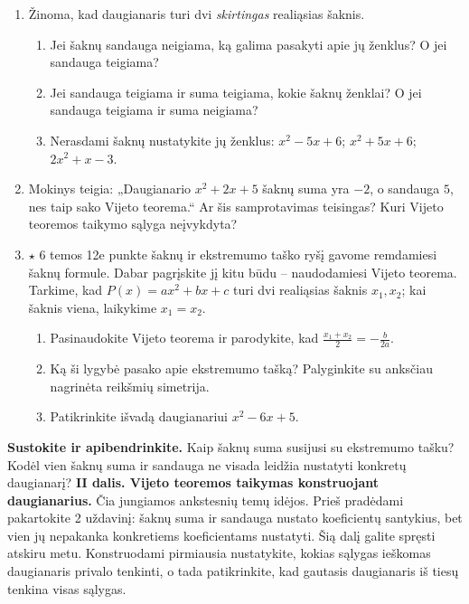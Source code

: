 \documentclass[12pt,a4paper]{article}
\begin{document}
\begin{enumerate}[series=uzdaviniai]
\item Žinoma, kad daugianaris turi dvi \emph{skirtingas} realiąsias šaknis.
\begin{enumerate}
\item Jei šaknų sandauga neigiama, ką galima pasakyti apie jų ženklus? O jei sandauga teigiama?
\item Jei sandauga teigiama ir suma teigiama, kokie šaknų ženklai? O jei sandauga teigiama ir suma neigiama?
\item Nerasdami šaknų nustatykite jų ženklus: $x^2-5x+6$; $x^2+5x+6$; $2x^2+x-3$.
\end{enumerate}
\item Mokinys teigia: „Daugianario $x^2+2x+5$ šaknų suma yra $-2$, o sandauga $5$, nes taip sako Vijeto teorema.“ Ar šis samprotavimas teisingas? Kuri Vijeto teoremos taikymo sąlyga neįvykdyta?
\item $\star$ 6 temos 12e punkte šaknų ir ekstremumo taško ryšį gavome remdamiesi šaknų formule. Dabar pagrįskite jį kitu būdu – naudodamiesi Vijeto teorema. Tarkime, kad $P(x)=ax^2+bx+c$ turi dvi realiąsias šaknis $x_1,x_2$; kai šaknis viena, laikykime $x_1=x_2$.
\begin{enumerate}
\item Pasinaudokite Vijeto teorema ir parodykite, kad $\frac{x_1+x_2}{2}=-\frac{b}{2a}$.
\item Ką ši lygybė pasako apie ekstremumo tašką? Palyginkite su anksčiau nagrinėta reikšmių simetrija.
\item Patikrinkite išvadą daugianariui $x^2-6x+5$.
\end{enumerate}
\end{enumerate}
\textbf{Sustokite ir apibendrinkite.} Kaip šaknų suma susijusi su ekstremumo tašku? Kodėl vien šaknų suma ir sandauga ne visada leidžia nustatyti konkretų daugianarį?
\needspace{4cm}
\textbf{II dalis. Vijeto teoremos taikymas konstruojant daugianarius.} Čia jungiamos ankstesnių temų idėjos. Prieš pradėdami pakartokite 2 uždavinį: šaknų suma ir sandauga nustato koeficientų santykius, bet vien jų nepakanka konkretiems koeficientams nustatyti. Šią dalį galite spręsti atskiru metu. Konstruodami pirmiausia nustatykite, kokias sąlygas ieškomas daugianaris privalo tenkinti, o tada patikrinkite, kad gautasis daugianaris iš tiesų tenkina visas sąlygas.
\end{document}
